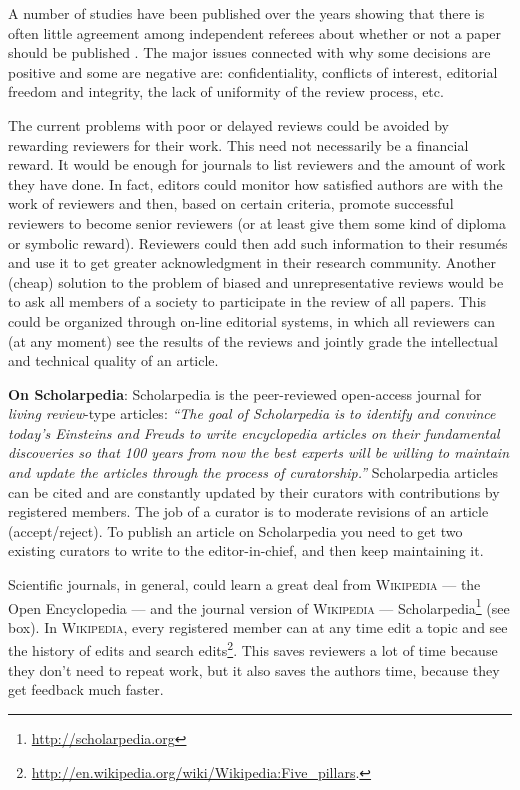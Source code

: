 \documentclass[graybox,envcountchap,sectrefs,UStrade]{svmono}
\newenvironment{fminipage}{\begin{Sbox}\begin{minipage}}{\end{minipage}\end{Sbox}\fbox{\TheSbox}}
\begin{document}
A number of studies have been published over the years showing that there is often little agreement among independent referees about whether or not a paper should be published \citep{schultz2010Scientometrics}. The major issues connected with why some decisions are positive and some are negative are: confidentiality, conflicts of interest, editorial freedom and integrity, the lack of uniformity of the review process, etc.\par

The current problems with poor or delayed reviews could be avoided by rewarding reviewers for their work. This need not necessarily be a financial reward. It would be enough for journals to list reviewers and the amount of work they have done. In fact, editors could monitor how satisfied authors are with the work of reviewers and then, based on certain criteria, promote successful reviewers to become senior reviewers (or at least give them some kind of diploma or symbolic reward). Reviewers could then add such information to their resum\'{e}s and use it to get greater acknowledgment in their research community. Another (cheap) solution to the problem of biased and unrepresentative reviews would be to ask all members of a society to participate in the review of all papers. This could be organized through on-line editorial systems, in which all reviewers can (at any moment) see the results of the reviews and jointly grade the intellectual and technical quality of an article. \par

\bigskip
\begin{fminipage}{.9\textwidth}{\footnotesize{\textsf{\textbf{On Scholarpedia}}: Scholarpedia is the peer-reviewed open-access journal for \emph{living review}-type articles: \emph{``The goal of Scholarpedia is to identify and convince today's Einsteins and Freuds to write encyclopedia articles on their fundamental discoveries so that 100 years from now the best experts will be willing to maintain and update the articles through the process of curatorship.''} Scholarpedia articles can be cited and are constantly updated by their curators with contributions by registered members. The job of a curator is to moderate revisions of an article (accept/reject). To publish an article on Scholarpedia you need to get two existing curators to write to the editor-in-chief, and then keep maintaining it.} }
\end{fminipage}
\bigskip

Scientific journals, in general, could learn a great deal from \textsc{Wikipedia} --- the Open Encyclopedia --- and the journal version of \textsc{Wikipedia} --- Scholarpedia\footnote{\url{http://scholarpedia.org}} (see box). In \textsc{Wikipedia}, every registered member can at any time edit a topic and see the history of edits and search edits\footnote{\url{http://en.wikipedia.org/wiki/Wikipedia:Five_pillars}.}. This saves reviewers a lot of time because they don't need to repeat work, but it also saves the authors time, because they get feedback much faster. \par
\end{document}
